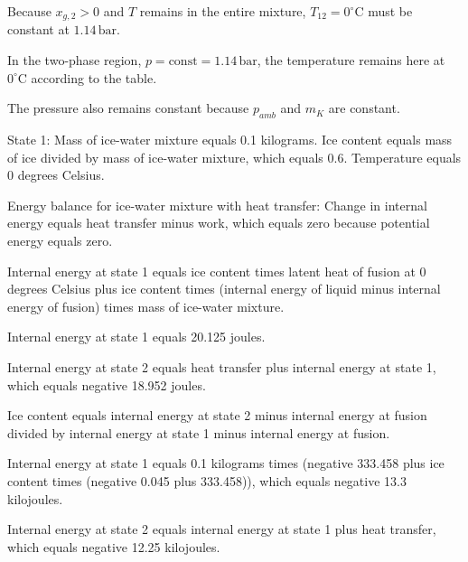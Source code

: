 Because \( x_{g,2} > 0 \) and \( T \) remains in the entire mixture, \( T_{12} = 0^\circ \text{C} \) must be constant at \( 1.14 \, \text{bar} \).  

In the two-phase region, \( p = \text{const} = 1.14 \, \text{bar} \), the temperature remains here at \( 0^\circ \text{C} \) according to the table.  

The pressure also remains constant because \( p_{amb} \) and \( m_K \) are constant.

State 1:  
Mass of ice-water mixture equals 0.1 kilograms.  
Ice content equals mass of ice divided by mass of ice-water mixture, which equals 0.6.  
Temperature equals 0 degrees Celsius.  

Energy balance for ice-water mixture with heat transfer:  
Change in internal energy equals heat transfer minus work, which equals zero because potential energy equals zero.  

Internal energy at state 1 equals ice content times latent heat of fusion at 0 degrees Celsius plus ice content times (internal energy of liquid minus internal energy of fusion) times mass of ice-water mixture.  

Internal energy at state 1 equals 20.125 joules.  

Internal energy at state 2 equals heat transfer plus internal energy at state 1, which equals negative 18.952 joules.  

Ice content equals internal energy at state 2 minus internal energy at fusion divided by internal energy at state 1 minus internal energy at fusion.  

Internal energy at state 1 equals 0.1 kilograms times (negative 333.458 plus ice content times (negative 0.045 plus 333.458)), which equals negative 13.3 kilojoules.  

Internal energy at state 2 equals internal energy at state 1 plus heat transfer, which equals negative 12.25 kilojoules.